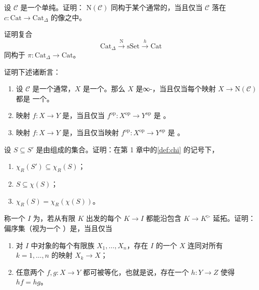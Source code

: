 \begin{exercise}\label{ex:coherent-nerve-image-of-c}
设 $\mathcal{C}$ 是一个单纯\trCategory{}。证明：\trCoherentNerve{}%
$\mathrm{N}(\mathcal{C})$ 同构于某个通常\trCategory{}的\trNerve{}，当且仅当
$\mathcal{C}$ 落在\trFunctor{} $c\colon \mathrm{Cat} \to \mathrm{Cat}_{\Delta}$ 的像之中。
\end{exercise}

\begin{exercise}\label{ex:h-n-pi}
证明复合
\[
\mathrm{Cat}_{\Delta}
\xrightarrow{\ \mathrm{N}\ }
\mathrm{sSet}
\xrightarrow{\ h\ }
\mathrm{Cat}
\]
同构于\trFunctor{} $\pi\colon \mathrm{Cat}_{\Delta} \to \mathrm{Cat}$。
\end{exercise}

\begin{exercise}\label{ex:inner-fibration-op}
证明下述诸断言：
\begin{enumerate}[label=(\arabic*)]
  \item 设 $\mathcal{C}$ 是一个通常\trCategory{}，$X$ 是一个\trSimplicialSet{}。那么
        $X$ 是∞-\trCategory{}，当且仅当每个映射 $X \to \mathrm{N}(\mathcal{C})$ 都是
        一个\trInnerFibration{}。
  \item 映射 $f\colon X \to Y$ 是\trInnerFibration{}，当且仅当
        $f^{\mathrm{op}}\colon X^{\mathrm{op}} \to Y^{\mathrm{op}}$ 是%
        \trInnerFibration{}。
  \item 映射 $f\colon X \to Y$ 是\trLeftFibration{}，当且仅当映射
        $f^{\mathrm{op}}\colon X^{\mathrm{op}} \to Y^{\mathrm{op}}$ 是%
        \trRightFibration{}。
\end{enumerate}
\end{exercise}

\begin{exercise}\label{ex:chi-galois}
设 $S \subseteq S'$ 是由\trMorphism{}组成的集合。证明：在第 1 章中的\cref{def:chi}
的记号下，
\begin{enumerate}[label=(\arabic*)]
  \item $\chi_R(S') \subseteq \chi_R(S)$；
  \item $S \subseteq \chi(S)$；
  \item $\chi_R(S) = \chi_R(\chi(S))$。
\end{enumerate}
\end{exercise}

\begin{exercise}\label{ex:filtered-poset-characterization}
称一个\trCategory{} $I$ 为\emph{\trFiltered{}}，若从有限\trCategory{} $K$ 出发的每个%
\trFunctor{} $K \to I$ 都能沿包含 $K \to K^{\rhd}$ 延拓。证明：偏序集（视为一个%
\trCategory{}）是\trFiltered{}，当且仅当
\begin{enumerate}[label=(\arabic*)]
  \item 对 $I$ 中对象的每个有限族 $X_1, \dots, X_n$，存在 $I$ 的一个\trObject{} $X$
        连同对所有 $k = 1, \dots, n$ 的映射 $X_k \to X$；
  \item 任意两个\trMorphism{} $f, g\colon X \to Y$ 都可被等化，也就是说，存在一个%
        \trMorphism{} $h\colon Y \to Z$ 使得 $hf = hg$。
\end{enumerate}
\end{exercise}

